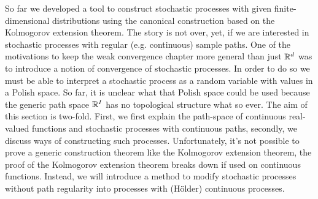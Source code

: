 So far we developed a tool to construct stochastic processes with given finite-dimensional distributions using the canonical construction based on the Kolmogorov extension theorem. The story is not over, yet, if we are interested in stochastic processes with regular (e.g. continuous) sample paths. One of the motivations to keep the weak convergence chapter more general than just $\mathbb{R}^d$ was to introduce a notion of convergence of stochastic processes. In order to do so we must be able to interpret a stochastic process as a random variable with values in a Polish space. So far, it is unclear what that Polish space could be used because the generic path space $\mathbb{R}^{I}$ has no topological structure what so ever. The aim of this section is two-fold. First, we first explain the path-space of continuous real-valued functions and stochastic processes with continuous paths, secondly, we discuss ways of constructing such processes. Unfortunately, it's not possible to prove a generic construction theorem like the Kolmogorov extension theorem, the proof of the Kolmogorov extension theorem breaks down if used on continuous functions. Instead, we will introduce a method to modify stochastic processes without path regularity into processes with (H\"older) continuous processes. 

